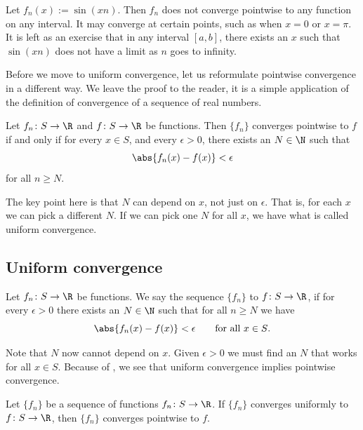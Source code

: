 \documentclass[12pt]{book}
\begin{document}
\begin{example}
Let $f_n(x) := \sin(xn)$.
Then $f_n$ does not converge pointwise
to any function on any interval.
It may converge at certain points, such
as when $x=0$ or $x=\pi$.
It is left as an exercise that in any interval
$[a,b]$, there exists an $x$ such that $\sin(xn)$ does not have a limit
as $n$ goes to infinity.
\end{example}

Before we move to uniform convergence, let us reformulate pointwise
convergence in a different way.
We leave the proof to the reader, it is a simple application of the
definition of convergence of a sequence of real numbers.

\begin{prop} \label{ptwsconv:prop}
Let $f_n \colon S \to \R$ and $f \colon S \to \R$ be functions.
Then $\{ f_n \}$ converges pointwise to $f$ if and only if
for every $x \in S$, and every $\epsilon > 0$, there exists
an $N \in \N$ such that
\begin{equation*}
\abs{f_n(x)-f(x)} < \epsilon
\end{equation*}
for all $n \geq N$.
\end{prop}

The key point here is that $N$ can depend on $x$, not just on
$\epsilon$.
That is, for each $x$ we can pick a different $N$.
If we can pick one $N$ for all $x$, we have what is called
uniform convergence.

\subsection*{Uniform convergence}

\begin{defn}
Let $f_n \colon S \to \R$ be functions.
We say the sequence $\{ f_n \}$
\emph{} to $f \colon S \to \R$, if for
every $\epsilon > 0$ there exists an $N \in \N$ such that 
for all $n \geq N$ we have
\begin{equation*}
\abs{f_n(x) - f(x)} < \epsilon \qquad \text{for all $x \in S$.}
\end{equation*}
\end{defn}

Note that $N$ now cannot depend on $x$.
Given $\epsilon > 0$
we must find an $N$ that works for all $x \in S$.
Because of
, we see that uniform convergence
implies pointwise convergence.

\begin{prop}
Let $\{ f_n \}$ be a sequence of functions $f_n \colon S \to \R$.
If $\{ f_n \}$ converges
uniformly to $f \colon S \to \R$, then $\{ f_n \}$ converges pointwise to $f$.
\end{prop}
\end{document}
